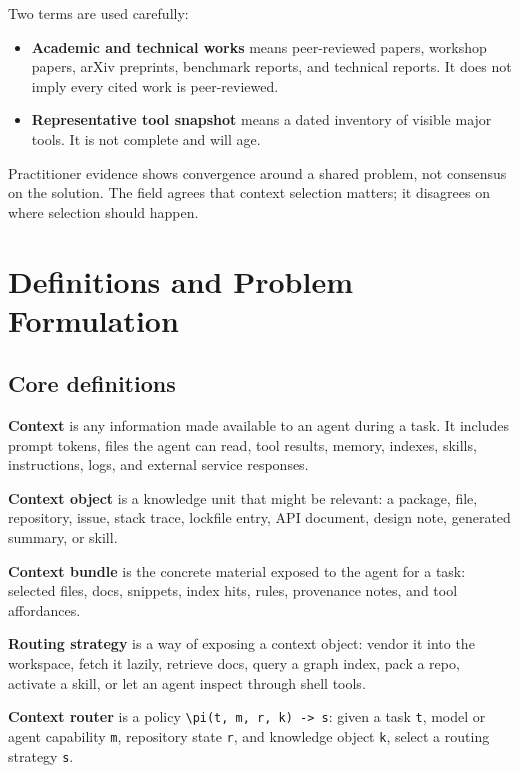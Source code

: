 \documentclass[
  11pt,
  letterpaper,
  numbers=noendperiod,
  parskip=half]{scrartcl}
\providecommand{\tightlist}{%
  \setlength{\itemsep}{0pt}\setlength{\parskip}{0pt}}
\begin{document}
Two terms are used carefully:

\begin{itemize}
\tightlist
\item
  \textbf{Academic and technical works} means peer-reviewed papers,
  workshop papers, arXiv preprints, benchmark reports, and technical
  reports. It does not imply every cited work is peer-reviewed.
\item
  \textbf{Representative tool snapshot} means a dated inventory of
  visible major tools. It is not complete and will age.
\end{itemize}

Practitioner evidence shows convergence around a shared problem, not
consensus on the solution. The field agrees that context selection
matters; it disagrees on where selection should happen.

\section{Definitions and Problem Formulation}\label{sec-formal}

\subsection{Core definitions}\label{sec-definitions}

\textbf{Context} is any information made available to an agent during a
task. It includes prompt tokens, files the agent can read, tool results,
memory, indexes, skills, instructions, logs, and external service
responses.

\textbf{Context object} is a knowledge unit that might be relevant: a
package, file, repository, issue, stack trace, lockfile entry, API
document, design note, generated summary, or skill.

\textbf{Context bundle} is the concrete material exposed to the agent
for a task: selected files, docs, snippets, index hits, rules,
provenance notes, and tool affordances.

\textbf{Routing strategy} is a way of exposing a context object: vendor
it into the workspace, fetch it lazily, retrieve docs, query a graph
index, pack a repo, activate a skill, or let an agent inspect through
shell tools.

\textbf{Context router} is a policy
\texttt{\textbackslash{}pi(t,\ m,\ r,\ k)\ -\textgreater{}\ s}: given a
task \texttt{t}, model or agent capability \texttt{m}, repository state
\texttt{r}, and knowledge object \texttt{k}, select a routing strategy
\texttt{s}.
\end{document}
